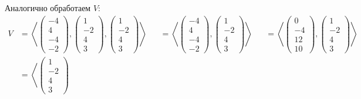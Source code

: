 \documentclass[12pt,a4paper]{article}
\begin{document}
\begin{enumproblem}[.1]
        Аналогично обработаем $V$:
        \begin{align*}
            V
            &= \left\langle
                \begin{pmatrix}
                    -4 \\ 4 \\ -4 \\ -2
                \end{pmatrix},
                \begin{pmatrix}
                    1 \\ -2 \\ 4 \\ 3
                \end{pmatrix},
                \begin{pmatrix}
                    1 \\ -2 \\ 4 \\ 3
                \end{pmatrix}
            \right\rangle&
            &= \left\langle
                \begin{pmatrix}
                    -4 \\ 4 \\ -4 \\ -2
                \end{pmatrix},
                \begin{pmatrix}
                    1 \\ -2 \\ 4 \\ 3
                \end{pmatrix}
            \right\rangle&
            &= \left\langle
                \begin{pmatrix}
                    0 \\ -4 \\ 12 \\ 10
                \end{pmatrix},
                \begin{pmatrix}
                    1 \\ -2 \\ 4 \\ 3
                \end{pmatrix}
            \right\rangle\\
            &= \left\langle
                \begin{pmatrix}
                    1 \\ -2 \\ 4 \\ 3

\end{pmatrix}
\end{align*}
\end{enumproblem}
\end{document}
